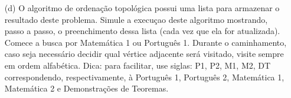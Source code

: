 \documentclass[16pt]{examdesign}
\begin{document}
\begin{fillin}[title={},
                    rearrange=no,resetcounter=no,suppressprefix]
\begin{question}
\begin{itemize}
		  ~\\
		  \item[(d)] O algoritmo de ordenação topológica possui uma lista para armazenar o resultado deste problema. 
		  Simule a execuçao deste algoritmo mostrando, passo a passo, o preenchimento dessa lista (cada vez que ela for atualizada).%
		  Comece a busca por Matemática 1 ou Português 1. 
		  Durante o caminhamento, caso seja necessário decidir qual vértice adjacente será visitado, visite sempre em ordem alfabética.
		  Dica: para facilitar, use siglas: P1, P2, M1, M2, DT correspondendo, respectivamente, à Português 1, Português 2, Matemática 1, 
		  Matemática 2 e Demonstrações de Teoremas. 
		  

\end{itemize}
\end{question}
\end{fillin}
\end{document}
